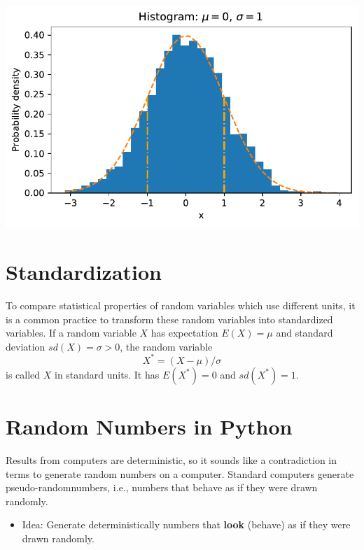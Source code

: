 \documentclass[
  letterpaper,
  DIV=11,
  numbers=noendperiod]{scrreprt}
\providecommand{\tightlist}{%
  \setlength{\itemsep}{0pt}\setlength{\parskip}{0pt}}\usepackage{longtable,booktabs,array}
\begin{document}
\includegraphics{006_num_gp_files/figure-pdf/cell-16-output-1.pdf}

\hypertarget{standardization}{%
\section{Standardization}\label{standardization}}

To compare statistical properties of random variables which use
different units, it is a common practice to transform these random
variables into standardized variables. If a random variable \(X\) has
expectation \(E(X) = \mu\) and standard deviation \(sd(X) = \sigma >0\),
the random variable \[
X^{\ast} = (X-\mu)/\sigma
\] is called \(X\) in standard units. It has \(E(X^{\ast}) = 0\) and
\(sd(X^{\ast}) =1\).

\hypertarget{random-numbers-in-python}{%
\section{Random Numbers in Python}\label{random-numbers-in-python}}

Results from computers are deterministic, so it sounds like a
contradiction in terms to generate random numbers on a computer.
Standard computers generate pseudo-randomnumbers, i.e., numbers that
behave as if they were drawn randomly.

\begin{tcolorbox}[enhanced jigsaw, rightrule=.15mm, opacityback=0, colframe=quarto-callout-note-color-frame, opacitybacktitle=0.6, toptitle=1mm, arc=.35mm, colbacktitle=quarto-callout-note-color!10!white, coltitle=black, toprule=.15mm, leftrule=.75mm, titlerule=0mm, title=\textcolor{quarto-callout-note-color}{\faInfo}\hspace{0.5em}{Deterministic Random Numbers}, bottomrule=.15mm, breakable, bottomtitle=1mm, left=2mm, colback=white]

\begin{itemize}
\tightlist
\item
  Idea: Generate deterministically numbers that \textbf{look} (behave)
  as if they were drawn randomly.
\end{itemize}

\end{tcolorbox}
\end{document}
